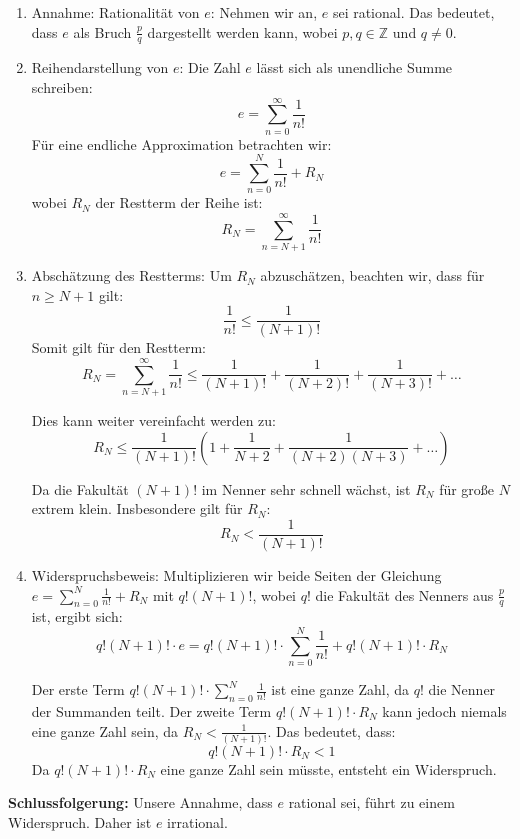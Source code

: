 \documentclass[11pt]{article}
\begin{document}
\begin{enumerate}
    \item Annahme: Rationalität von \(e\):
    Nehmen wir an, \(e\) sei rational. Das bedeutet, dass \(e\) als Bruch \(\frac{p}{q}\) dargestellt werden kann, wobei \(p, q \in \mathbb{Z}\) und \(q \neq 0\).

    \item Reihendarstellung von \(e\):
    Die Zahl \(e\) lässt sich als unendliche Summe schreiben:
    \[
    e = \sum_{n=0}^\infty \frac{1}{n!}
    \]
    Für eine endliche Approximation betrachten wir:
    \[
    e = \sum_{n=0}^N \frac{1}{n!} + R_N
    \]
    wobei \(R_N\) der Restterm der Reihe ist:
    \[
    R_N = \sum_{n=N+1}^\infty \frac{1}{n!}
    \]

    \item Abschätzung des Restterms:
    Um \(R_N\) abzuschätzen, beachten wir, dass für \(n \geq N+1\) gilt:
    \[
    \frac{1}{n!} \leq \frac{1}{(N+1)!}
    \]
    Somit gilt für den Restterm:
    \[
    R_N = \sum_{n=N+1}^\infty \frac{1}{n!} \leq \frac{1}{(N+1)!} + \frac{1}{(N+2)!} + \frac{1}{(N+3)!} + \dots
    \]

    Dies kann weiter vereinfacht werden zu:
    \[
    R_N \leq \frac{1}{(N+1)!} \left( 1 + \frac{1}{N+2} + \frac{1}{(N+2)(N+3)} + \dots \right)
    \]

    Da die Fakultät \((N+1)!\) im Nenner sehr schnell wächst, ist \(R_N\) für große \(N\) extrem klein. Insbesondere gilt für \(R_N\):
    \[
    R_N < \frac{1}{(N+1)!}
    \]

    \item Widerspruchsbeweis:
    Multiplizieren wir beide Seiten der Gleichung \(e = \sum_{n=0}^N \frac{1}{n!} + R_N\) mit \(q! (N+1)!\), wobei \(q!\) die Fakultät des Nenners aus \(\frac{p}{q}\) ist, ergibt sich:
    \[
    q!(N+1)! \cdot e = q!(N+1)! \cdot \sum_{n=0}^N \frac{1}{n!} + q!(N+1)! \cdot R_N
    \]

    Der erste Term \(q!(N+1)! \cdot \sum_{n=0}^N \frac{1}{n!}\) ist eine ganze Zahl, da \(q!\) die Nenner der Summanden teilt. Der zweite Term \(q!(N+1)! \cdot R_N\) kann jedoch niemals eine ganze Zahl sein, da \(R_N < \frac{1}{(N+1)!}\). Das bedeutet, dass:
    \[
    q!(N+1)! \cdot R_N < 1
    \]
    Da \(q!(N+1)! \cdot R_N\) eine ganze Zahl sein müsste, entsteht ein Widerspruch.

\end{enumerate}

\textbf{Schlussfolgerung:} Unsere Annahme, dass \(e\) rational sei, führt zu einem Widerspruch. Daher ist \(e\) irrational.
\end{document}
